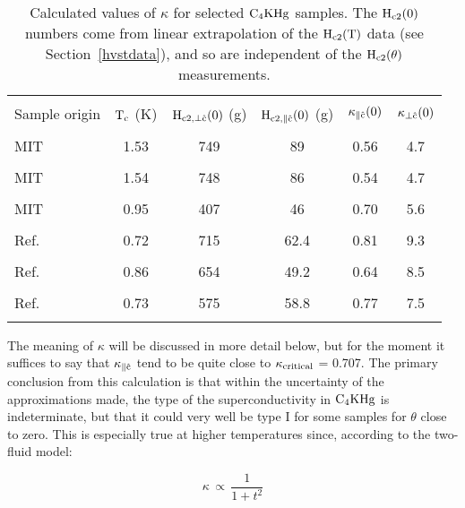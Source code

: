 \begin{table}
\caption[Calculated values of $\kappa$ for selected $\rm C_4KHg$
samples.]{Calculated values of  $\kappa$ for selected $\rm C_4KHg$ samples.
The  $\rm H_{c2}(0)$  numbers come  from  linear extrapolation  of the $\rm
H_{c2}(T)$ data (see Section~\ref{hvstdata}), and so are independent of the
$\rm H_{c2}(\theta)$ measurements.}
\label{kappatable}
\begin{center}
\begin{tabular}{|l|ccccc|}
\hline
& & & & & \\
Sample origin & $\rm T_c$ (K) & $\rm H_{c2,\perp\hat{c}}(0)$ (g) & $\rm H_{c2,\parallel\hat{c}}(0)$ (g) & $\rm \kappa_{\parallel\hat{c}}(0)$ & $\rm \kappa_{\perp\hat{c}}(0)$\\
& & & & & \\
\hline
MIT & 1.53 & 749 & 89 & 0.56 & 4.7\\
& & & & & \\
MIT & 1.54 & 748 & 86 & 0.54 & 4.7\\
& & & & & \\
MIT & 0.95 & 407 & 46 & 0.70 & 5.6\\
& & & & & \\
Ref.~\cite{iye82} & 0.72 & 715 & 62.4 & 0.81 & 9.3\\
& & & & & \\
Ref.~\cite{iye82} & 0.86 & 654 & 49.2 & 0.64 & 8.5\\
& & & & & \\
Ref.~\cite{iye82} & 0.73 & 575 & 58.8 & 0.77 & 7.5\\
& & & & & \\
\hline
\end{tabular}
\end{center}

\end{table}


	The meaning of $\kappa$ will be discussed in more detail below, but
for the moment it suffices to say that $\rm \kappa_{\parallel \hat{c}}$ tend
to  be  quite close to   $\rm  \kappa_{critical}$  =   0.707.   The primary
conclusion from  this calculation  is  that within  the  uncertainty of the
approximations made, the  type of the  superconductivity in $\rm  C_4KHg$ is
indeterminate, but that it could  very well be type I  for some samples for
$\theta$  close to zero.  This  is   especially true at higher temperatures
since, according to the two-fluid model:\cite{tinkham80}

\[
\kappa \, \propto \, \frac{1}{1 + t^2}
\]

